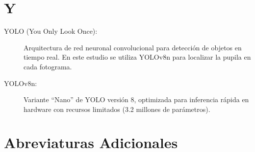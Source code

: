 \section*{Y}

\begin{description}
    \item[YOLO (You Only Look Once):] Arquitectura de red neuronal convolucional para detección de objetos en tiempo real. En este estudio se utiliza YOLOv8n para localizar la pupila en cada fotograma.
    
    \item[YOLOv8n:] Variante ``Nano'' de YOLO versión 8, optimizada para inferencia rápida en hardware con recursos limitados (3.2 millones de parámetros).
\end{description}

\vspace{1cm}

\section*{Abreviaturas Adicionales}

